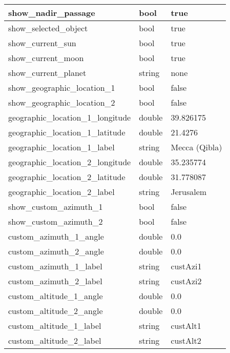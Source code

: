 \begin{longtabu} {l|l|l}
show\_nadir\_passage           &bool        & true  \\\midrule
show\_selected\_object         &bool        & true  \\\midrule
show\_current\_sun             &bool        & true  \\\midrule
show\_current\_moon            &bool        & true  \\\midrule
show\_current\_planet          &string      & none  \\\midrule
show\_geographic\_location\_1  &bool        & false         \\\midrule
show\_geographic\_location\_2  &bool        & false         \\\midrule
geographic\_location\_1\_longitude &double  & 39.826175     \\\midrule
geographic\_location\_1\_latitude  &double  & 21.4276       \\\midrule
geographic\_location\_1\_label     &string  & Mecca (Qibla) \\\midrule
geographic\_location\_2\_longitude &double  & 35.235774     \\\midrule
geographic\_location\_2\_latitude  &double  & 31.778087     \\\midrule
geographic\_location\_2\_label     &string  & Jerusalem     \\\midrule
show\_custom\_azimuth\_1       &bool        & false    \\\midrule
show\_custom\_azimuth\_2       &bool        & false    \\\midrule
custom\_azimuth\_1\_angle      &double      & 0.0      \\\midrule
custom\_azimuth\_2\_angle      &double      & 0.0      \\\midrule
custom\_azimuth\_1\_label      &string      & custAzi1 \\\midrule
custom\_azimuth\_2\_label      &string      & custAzi2 \\\bottomrule
custom\_altitude\_1\_angle     &double      & 0.0      \\\midrule
custom\_altitude\_2\_angle     &double      & 0.0      \\\midrule
custom\_altitude\_1\_label     &string      & custAlt1 \\\midrule
custom\_altitude\_2\_label     &string      & custAlt2 \\\bottomrule
\end{longtabu}




